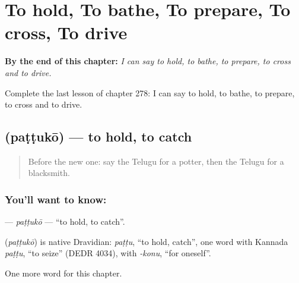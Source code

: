
\chapter{To hold, To bathe, To prepare, To cross, To drive}
\label{ch:te-to-hold-to-bathe-to-prepare-to-cross-to-drive}

\begin{chapteropening}
\textbf{By the end of this chapter:} \emph{I can say to hold, to bathe, to prepare, to cross and to drive.}

Complete the last lesson of chapter 278: I can say to hold, to bathe, to prepare, to cross and to drive.
\end{chapteropening}

\section[\texorpdfstring{\te{పట్టుకో} (paṭṭukō)}{పట్టుకో (paṭṭukō)}]{ (paṭṭukō) — to hold, to catch}

\label{lesson:TE-C278-pattuko}



\begin{quote}
Before the new one: say the Telugu for a potter, then the Telugu for a blacksmith.
\end{quote}

\subsection*{You'll want to know: }
\textbf{} — \emph{paṭṭukō} — \textquotedblleft{}to hold, to catch\textquotedblright{}.

\begin{cousinweb}
\textbf{} (\emph{paṭṭukō}) is native Dravidian: \emph{paṭṭu}, \textquotedblleft{}to hold, catch\textquotedblright{}, one word with Kannada \emph{paṭṭu}, \textquotedblleft{}to seize\textquotedblright{} (DEDR 4034), with \emph{-konu}, \textquotedblleft{}for oneself\textquotedblright{}.
\end{cousinweb}

\begin{grammarlens}[title={What you've built}]
One more word for this chapter.
\end{grammarlens}

